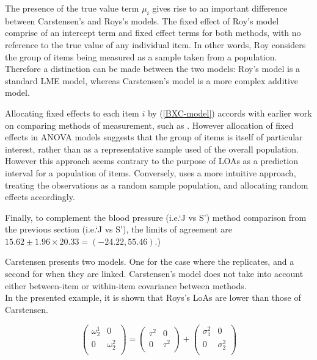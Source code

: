 \documentclass[12pt, a4paper]{report}
\theoremstyle{plain}
\theoremstyle{definition}
\theoremstyle{remark}
\begin{document}
	The presence of the true value term $\mu_i$ gives rise to an important difference between Carstensen's and Roys's models. The fixed effect of Roy's model comprise of an intercept term and fixed effect terms for both methods, with no reference to the true value of any individual item. In other words, Roy considers the group of items being measured as a sample taken from a population. Therefore a distinction can be made between the two models: Roy's model is a standard LME model, whereas Carstensen's model is a more complex additive model.
	
	
	Allocating fixed effects to each item $i$ by (\ref{BXC-model}) accords with earlier work on comparing methods of measurement, such as \citet{Grubbs48}. However allocation of fixed effects in ANOVA models suggests that the group of items is itself of particular interest, rather than as a representative sample used of the overall population. However this approach seems contrary to the purpose of LOAs as a prediction interval for a population of items. Conversely, \citet{ARoy2009}
	uses a more intuitive approach, treating the observations as a random sample population, and allocating random effects accordingly.
	
	Finally, to complement the blood pressure (i.e.`J vs S') method comparison from the previous section (i.e.`J vs S'), the limits of agreement are $15.62 \pm 1.96 \times 20.33 = (-24.22, 55.46)$.)
	
	Carstensen presents two models. One for the case where the replicates, and a second for when they are linked.
	Carstensen's model does not take into account either between-item or within-item covariance between methods.\\
	In the presented example, it is shown that Roys's LoAs are lower than those of Carstensen.
	
	
	
	
	\[\left(\begin{array}{cc}
	\omega^1_2  & 0 \\
	0 & \omega^2_2 \\
	\end{array}  \right)
	=  \left(
	\begin{array}{cc}
	\tau^2  & 0 \\
	0 & \tau^2 \\
	\end{array} \right)+
	\left(
	\begin{array}{cc}
	\sigma^2_1  & 0 \\
	0 & \sigma^2_2 \\
	\end{array}\right)
	\]
	
\end{document}
